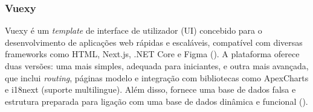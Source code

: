 \subsubsection{Vuexy}

Vuexy é um \textit{template} de interface de utilizador (UI) concebido para o desenvolvimento de aplicações web rápidas e escaláveis, compatível com diversas frameworks como HTML, Next.js, .NET Core e Figma (\cite{PixInvent2025}). A plataforma oferece duas versões: uma mais simples, adequada para iniciantes, e outra mais avançada, que inclui \textit{routing}, páginas modelo e integração com bibliotecas como ApexCharts e i18next (suporte multilingue). Além disso, fornece uma base de dados falsa e estrutura preparada para ligação com uma base de dados dinâmica e funcional (\cite{Vuexy2025}).

 \vspace{20mm}
